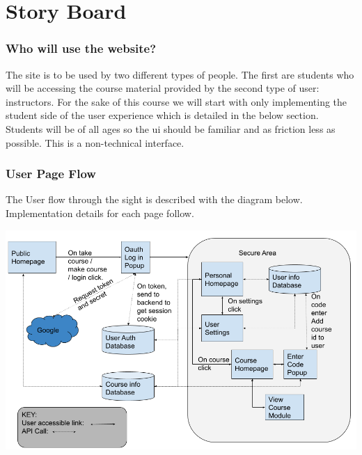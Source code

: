 \documentclass{article}
\begin{document}
\section{Story Board}
\subsubsection{Who will use the website?}
The site is to be used by two different types of people. The first are students
who will be accessing the course material provided by the second type of user:
instructors. For the sake of this course we will start with only implementing
the student side of the user experience which is detailed in the below section.
Students will be of all ages so the ui should be familiar and as friction less as
possible. This is a non-technical interface.

\subsubsection{User Page Flow}
The User flow through the sight is described with the diagram below.
Implementation details for each page follow.

\includegraphics[width=\textwidth]{flow}

\newpage
\end{document}
